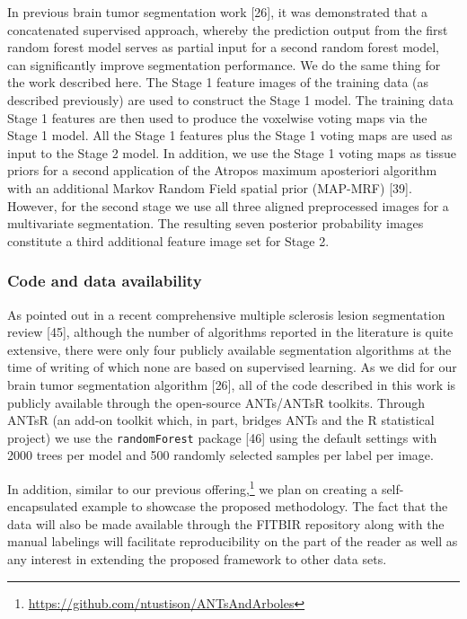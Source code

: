 \documentclass[11pt,]{article}
\let\rmarkdownfootnote\footnote%
\def\footnote{\protect\rmarkdownfootnote}
\begin{document}
In previous brain tumor segmentation work {[}26{]}, it was demonstrated
that a concatenated supervised approach, whereby the prediction output
from the first random forest model serves as partial input for a second
random forest model, can significantly improve segmentation performance.
We do the same thing for the work described here. The Stage 1 feature
images of the training data (as described previously) are used to
construct the Stage 1 model. The training data Stage 1 features are then
used to produce the voxelwise voting maps via the Stage 1 model. All the
Stage 1 features plus the Stage 1 voting maps are used as input to the
Stage 2 model. In addition, we use the Stage 1 voting maps as tissue
priors for a second application of the Atropos maximum aposteriori
algorithm with an additional Markov Random Field spatial prior (MAP-MRF)
{[}39{]}. However, for the second stage we use all three aligned
preprocessed images for a multivariate segmentation. The resulting seven
posterior probability images constitute a third additional feature image
set for Stage 2.

\subsubsection{Code and data
availability}\label{code-and-data-availability}

As pointed out in a recent comprehensive multiple sclerosis lesion
segmentation review {[}45{]}, although the number of algorithms reported
in the literature is quite extensive, there were only four publicly
available segmentation algorithms at the time of writing of which none
are based on supervised learning. As we did for our brain tumor
segmentation algorithm {[}26{]}, all of the code described in this work
is publicly available through the open-source ANTs/ANTsR toolkits.
Through ANTsR (an add-on toolkit which, in part, bridges ANTs and the R
statistical project) we use the \texttt{randomForest} package {[}46{]}
using the default settings with 2000 trees per model and 500 randomly
selected samples per label per image.

In addition, similar to our previous offering,\footnote{\url{https://github.com/ntustison/ANTsAndArboles}}
we plan on creating a self-encapsulated example to showcase the proposed
methodology. The fact that the data will also be made available through
the FITBIR repository along with the manual labelings will facilitate
reproducibility on the part of the reader as well as any interest in
extending the proposed framework to other data sets.
\end{document}
